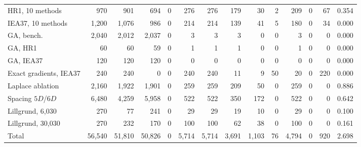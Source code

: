 \begin{table}[!htbp]
\begin{tabular}{lrrrrrrrrrrrrr}
HR1, 10 methods & 970 & 901 & 694 & 0 & 276 & 276 & 179 & 30 & 2 & 209 & 0 & 67 & 0.354 \\
IEA37, 10 methods & 1,200 & 1,076 & 986 & 0 & 214 & 214 & 139 & 41 & 5 & 180 & 0 & 34 & 0.000 \\
GA, bench. & 2,040 & 2,012 & 2,037 & 0 & 3 & 3 & 3 & 0 & 0 & 3 & 0 & 0 & 0.000 \\
GA, HR1 & 60 & 60 & 59 & 0 & 1 & 1 & 1 & 0 & 0 & 1 & 0 & 0 & 0.000 \\
GA, IEA37 & 120 & 120 & 120 & 0 & 0 & 0 & 0 & 0 & 0 & 0 & 0 & 0 & 0.000 \\
Exact gradients, IEA37 & 240 & 240 & 0 & 0 & 240 & 240 & 11 & 9 & 50 & 20 & 0 & 220 & 0.000 \\
Laplace ablation & 2,160 & 1,922 & 1,901 & 0 & 259 & 259 & 209 & 50 & 0 & 259 & 0 & 0 & 0.886 \\
Spacing $5D$/$6D$ & 6,480 & 4,259 & 5,958 & 0 & 522 & 522 & 350 & 172 & 0 & 522 & 0 & 0 & 0.642 \\
Lillgrund, 6,030 & 270 & 77 & 241 & 0 & 29 & 29 & 19 & 10 & 0 & 29 & 0 & 0 & 0.100 \\
Lillgrund, 30,030 & 270 & 232 & 170 & 0 & 100 & 100 & 62 & 38 & 0 & 100 & 0 & 0 & 0.161 \\
\midrule
Total & 56,540 & 51,810 & 50,826 & 0 & 5,714 & 5,714 & 3,691 & 1,103 & 76 & 4,794 & 0 & 920 & 2.698 \\
\bottomrule
\end{tabular}
\end{table}
